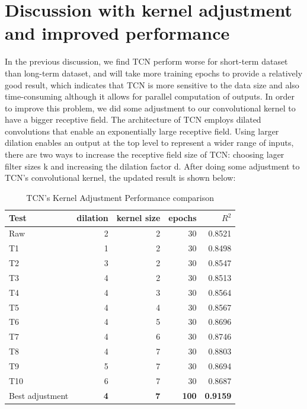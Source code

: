 \section{Discussion with kernel adjustment and improved performance}
In the previous discussion, we find TCN perform worse for short-term dataset than long-term dataset, and will take more training epochs to provide a relatively good result, which indicates that TCN is more sensitive to the data size and also time-consuming although it allows for parallel computation of outputs. In order to improve this problem, we did some adjustment to our convolutional kernel to have a bigger receptive field. The architecture of TCN employs dilated convolutions that enable an exponentially large receptive field. Using larger dilation enables an output at the top level to represent a wider range of inputs, there are two ways to increase the receptive field size of TCN: choosing lager filter sizes k and increasing the dilation factor d. After doing some adjustment to TCN's convolutional kernel, the updated result is shown below:

\begin{table}[H]
\centering
\caption{TCN's Kernel Adjustment Performance comparison}
\begin{tabular}{l r r r r}
\toprule
\textbf{Test}  & \textbf{dilation}& \textbf{kernel size} & \textbf{epochs}& \textbf{$R^2$}\\
\midrule
Raw & 2 & 2 & 30 & 0.8521\\
T1 & \color{blue}1 & 2 & 30 & 0.8498 \\
T2 & \color{blue}3 & 2 & 30 & 0.8547 \\
T3 & \color{blue}4 & 2 & 30 & 0.8513 \\
T4 & 4 & \color{blue}3 & 30 & 0.8564 \\
T5 & 4 & \color{blue}4 & 30 & 0.8567 \\
T6 & 4 & \color{blue}5 & 30 & 0.8696 \\
T7 & 4 & \color{blue}6 & 30 & 0.8746 \\
T8 & 4 & \color{blue}7 & 30 & 0.8803 \\
T9 & \color{blue}5 & 7 & 30 & 0.8694 \\
T10 & \color{blue}6 & 7 & 30 & 0.8687 \\
Best adjustment & \textbf{\color{red}4} & \textbf{\color{red}7} & \textbf{100} & \textbf{\color{red}0.9159} \\
\bottomrule
\end{tabular}
\label{tab:LSTM2}
\end{table}

